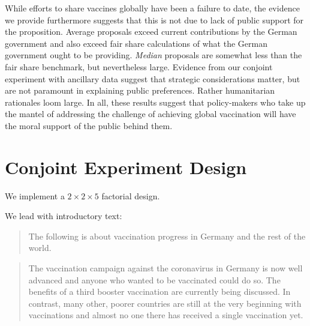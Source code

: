\documentclass[12pt,oneside]{article}
\begin{document}
While efforts to share vaccines globally have been a failure to date, the evidence we provide furthermore suggests that this is not due to lack of public support for the proposition. Average proposals exceed current contributions by the German government and also exceed fair share calculations of what the German government ought to be providing. \textit{Median} proposals are somewhat less than the fair share benchmark, but nevertheless large. Evidence from our conjoint experiment with ancillary data suggest that strategic considerations matter, but are not paramount in explaining public preferences. Rather humanitarian rationales loom large. In all, these results suggest that policy-makers who take up the mantel of addressing the challenge of achieving global vaccination will have the moral support of the public behind them.



\newpage




\clearpage
\setcounter{page}{1}

\begin{center}
\end{center}



\tableofcontents


\clearpage

\section{Conjoint Experiment Design}

We implement a \(2\times2\times5\) factorial design.

We lead with introductory text:

\begin{quote}
	The following is about vaccination progress in Germany and the rest of
	the world.
\end{quote}

\begin{quote}
	The vaccination campaign against the coronavirus in Germany is now well
	advanced and anyone who wanted to be vaccinated could do so. The
	benefits of a third booster vaccination are currently being discussed.
	In contrast, many other, poorer countries are still at the very
	beginning with vaccinations and almost no one there has received a
	single vaccination yet.
\end{quote}
\end{document}

